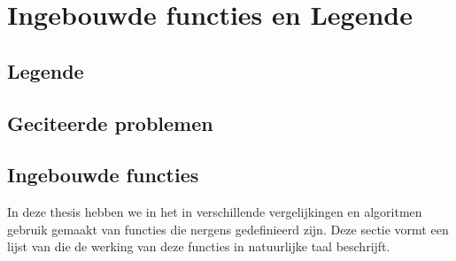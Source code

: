 \chapter{Ingebouwde functies en Legende}


\section{Legende}

\section{Geciteerde problemen}

\subsection{}

\subsection{}

\subsection{}

\subsection{}

\subsection{}

\subsection{}

\subsection{}

\section{Ingebouwde functies}

In deze thesis hebben we in het in verschillende vergelijkingen en algoritmen gebruik gemaakt van functies die nergens gedefinieerd zijn. Deze sectie vormt een lijst van die de werking van deze functies in natuurlijke taal beschrijft.